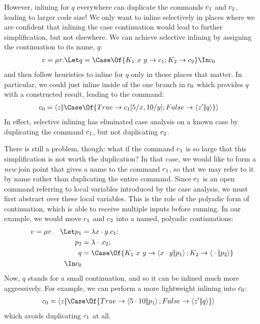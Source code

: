 \documentclass{article}
\begin{document}
However, inlining for $q$ everywhere can duplicate the commands $c_1$ and
$c_2$, leading to larger code size!  We only want to inline selectively in
places where we are confident that inlining the case continuation would lead to
further simplification, but not elsewhere.  We can achieve selective inlining by
assigning the continuation to its name, $q$:
\begin{align*}
  v
  &=
  \comp{r}
  \Let q = \Case\Of \{ K_1 ~ x ~ y \to \com_1; K_2 \to \com_2 \}
  \In \com_0
\end{align*}
and then follow heuristics to inline for $q$ only in those places that matter.
In particular, we could just inline inside of the one branch in $c_0$ which
provides $q$ with a constructed result, leading to the command:
\begin{align*}
  \com_0
  &=
  \cut{z}{\Case\Of \{ True \to \com_1[5/x,10/y]; False \to \cut{z'}{q} \}}
\end{align*}
In effect, selective inlining has eliminated case analysis on a known case by
duplicating the command $c_1$, but not duplicating $c_2$.

There is still a problem, though: what if the command $c_1$ is so large that
this simplification is not worth the duplication?  In that case, we would like
to form a \emph{new} join point that gives a name to the command $c_1$, so
that we may refer to it by name rather than duplicating the entire command.
Since $c_1$ is an open command referring to local variables introduced by the
case analysis, we must first abstract over these local variables.  This is the
role of the polyadic form of continuation, which is able to receive multiple
inputs before running.  In our example, we would move $c_1$ and $c_2$ into
a named, polyadic continuations:
\begin{gather*}
\begin{aligned}
  v
  &=
  \comp{r}
  &
    \Let
      p_1 &= \fnk{\pack{x}{y}} \com_1;
  \\
  &&
      p_2 &= \fnk{\packs{}{}} \com_2;
  \\
  &&
      q &= \Case\Of \{
          K_1 ~ x ~ y \to \cut{\pack{x}{y}}{p_1};
          K_2 \to \cut{\packs{}{}}{p_2}
          \}
  \\
  &&
    \In
    \com_0
\end{aligned}
\end{gather*}
Now, $q$ stands for a small continuation, and so it can be inlined much more
aggressively.  For example, we can perform a more lightweight inlining into
$c_0$:
\begin{align*}
  \com_0
  &=
  \cut{z}{\Case\Of \{ True \to \cut{\pack{5}{10}}{p_1}; False \to \cut{z'}{q} \}}
\end{align*}
which avoids duplicating $c_1$ at all.
\end{document}
